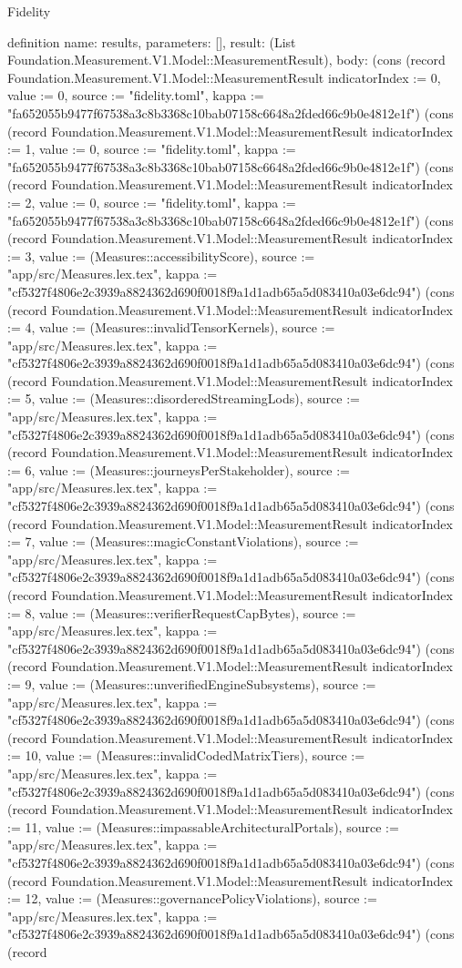 \begin{lexlean}{Fidelity}
\begin{semanticmodule}
definition{
  name: results,
  parameters: [],
  result: (List Foundation.Measurement.V1.Model::MeasurementResult),
  body: (cons (record Foundation.Measurement.V1.Model::MeasurementResult {indicatorIndex := 0, value := 0, source := "fidelity.toml", kappa := "fa652055b9477f67538a3c8b3368c10bab07158c6648a2fded66c9b0e4812e1f"}) (cons (record Foundation.Measurement.V1.Model::MeasurementResult {indicatorIndex := 1, value := 0, source := "fidelity.toml", kappa := "fa652055b9477f67538a3c8b3368c10bab07158c6648a2fded66c9b0e4812e1f"}) (cons (record Foundation.Measurement.V1.Model::MeasurementResult {indicatorIndex := 2, value := 0, source := "fidelity.toml", kappa := "fa652055b9477f67538a3c8b3368c10bab07158c6648a2fded66c9b0e4812e1f"}) (cons (record Foundation.Measurement.V1.Model::MeasurementResult {indicatorIndex := 3, value := (Measures::accessibilityScore), source := "app/src/Measures.lex.tex", kappa := "cf5327f4806e2c3939a8824362d690f0018f9a1d1adb65a5d083410a03e6dc94"}) (cons (record Foundation.Measurement.V1.Model::MeasurementResult {indicatorIndex := 4, value := (Measures::invalidTensorKernels), source := "app/src/Measures.lex.tex", kappa := "cf5327f4806e2c3939a8824362d690f0018f9a1d1adb65a5d083410a03e6dc94"}) (cons (record Foundation.Measurement.V1.Model::MeasurementResult {indicatorIndex := 5, value := (Measures::disorderedStreamingLods), source := "app/src/Measures.lex.tex", kappa := "cf5327f4806e2c3939a8824362d690f0018f9a1d1adb65a5d083410a03e6dc94"}) (cons (record Foundation.Measurement.V1.Model::MeasurementResult {indicatorIndex := 6, value := (Measures::journeysPerStakeholder), source := "app/src/Measures.lex.tex", kappa := "cf5327f4806e2c3939a8824362d690f0018f9a1d1adb65a5d083410a03e6dc94"}) (cons (record Foundation.Measurement.V1.Model::MeasurementResult {indicatorIndex := 7, value := (Measures::magicConstantViolations), source := "app/src/Measures.lex.tex", kappa := "cf5327f4806e2c3939a8824362d690f0018f9a1d1adb65a5d083410a03e6dc94"}) (cons (record Foundation.Measurement.V1.Model::MeasurementResult {indicatorIndex := 8, value := (Measures::verifierRequestCapBytes), source := "app/src/Measures.lex.tex", kappa := "cf5327f4806e2c3939a8824362d690f0018f9a1d1adb65a5d083410a03e6dc94"}) (cons (record Foundation.Measurement.V1.Model::MeasurementResult {indicatorIndex := 9, value := (Measures::unverifiedEngineSubsystems), source := "app/src/Measures.lex.tex", kappa := "cf5327f4806e2c3939a8824362d690f0018f9a1d1adb65a5d083410a03e6dc94"}) (cons (record Foundation.Measurement.V1.Model::MeasurementResult {indicatorIndex := 10, value := (Measures::invalidCodedMatrixTiers), source := "app/src/Measures.lex.tex", kappa := "cf5327f4806e2c3939a8824362d690f0018f9a1d1adb65a5d083410a03e6dc94"}) (cons (record Foundation.Measurement.V1.Model::MeasurementResult {indicatorIndex := 11, value := (Measures::impassableArchitecturalPortals), source := "app/src/Measures.lex.tex", kappa := "cf5327f4806e2c3939a8824362d690f0018f9a1d1adb65a5d083410a03e6dc94"}) (cons (record Foundation.Measurement.V1.Model::MeasurementResult {indicatorIndex := 12, value := (Measures::governancePolicyViolations), source := "app/src/Measures.lex.tex", kappa := "cf5327f4806e2c3939a8824362d690f0018f9a1d1adb65a5d083410a03e6dc94"}) (cons (record }
\end{semanticmodule}
\end{lexlean}
